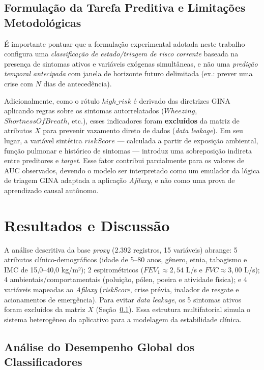 \documentclass[12pt]{article}
\begin{document}
\subsection{Formulação da Tarefa Preditiva e Limitações Metodológicas} \label{subsec:limitacoes_metodologia}
É importante pontuar que a formulação experimental adotada neste trabalho configura uma \textit{classificação de estado/triagem de risco corrente} baseada na presença de sintomas ativos e variáveis exógenas simultâneas, e não uma \textit{predição temporal antecipada} com janela de horizonte futuro delimitada (ex.: prever uma crise com $N$ dias de antecedência). 

Adicionalmente, como o rótulo $high\_risk$ é derivado das diretrizes GINA aplicando regras sobre os sintomas autorrelatados ($Wheezing$, $ShortnessOfBreath$, etc.), esses indicadores foram \textbf{excluídos} da matriz de atributos $X$ para prevenir vazamento direto de dados (\textit{data leakage}). Em seu lugar, a variável sintética $riskScore$ — calculada a partir de exposição ambiental, função pulmonar e histórico de sintomas — introduz uma sobreposição indireta entre preditores e \textit{target}. Esse fator contribui parcialmente para os valores de AUC observados, devendo o modelo ser interpretado como um emulador da lógica de triagem GINA adaptada a aplicação \textit{Afilaxy}, e não como uma prova de aprendizado causal autônomo.

\section{Resultados e Discussão} \label{sec:resultados}

A análise descritiva da base \textit{proxy} (2.392 registros, 15 variáveis) abrange: 5 atributos clínico-demográficos (idade de 5–80 anos, gênero, etnia, tabagismo e IMC de 15,0–40,0 kg/m²); 2 espirométricos ($FEV_1 \approx 2,54$ L/s e $FVC \approx 3,00$ L/s); 4 ambientais/comportamentais (poluição, pólen, poeira e atividade física); e 4 variáveis mapeadas ao \textit{Afilaxy} (\textit{riskScore}, crise prévia, inalador de resgate e acionamentos de emergência). Para evitar \textit{data leakage}, os 5 sintomas ativos foram excluídos da matriz $X$ (Seção~\ref{subsec:limitacoes_metodologia}). Essa estrutura multifatorial simula o sistema heterogêneo do aplicativo para a modelagem da estabilidade clínica.

\subsection{Análise do Desempenho Global dos Classificadores}
\end{document}
